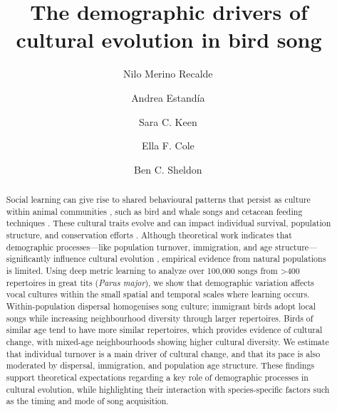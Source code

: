 \documentclass[9pt, onecolumn, twoside, lineno]{gsajnl}
\begin{document}
\title{The demographic drivers of cultural evolution in bird song}
\author[1,$\ast$]{Nilo Merino Recalde\,} 
\author[1]{Andrea Estandía\,}
\author[1,2]{Sara C. Keen\,}
\author[1]{Ella F. Cole\,} 
\author[1]{Ben C. Sheldon\,} 





\begin{abstract}
Social learning can give rise to shared behavioural patterns that persist as culture within animal communities \autocite{viciana2021, whiten2019}, such as bird and whale songs and cetacean feeding techniques \autocite{aplin2019, allen2013, garland2020}. These cultural traits evolve \autocite{potvin2015, williams2021,ju2019,riebel2015} and can impact individual survival, population structure, and conservation efforts \autocite{brakes2019}. Although theoretical work indicates that demographic processes---like population turnover, immigration, and age structure---significantly influence cultural evolution \autocite{deffner2022a, hudson2022, kandler2023}, empirical evidence from natural populations is limited. Using deep metric learning to analyze over 100,000 songs from >400 repertoires in great tits (\textit{Parus major}), we show that demographic variation affects vocal cultures within the small spatial and temporal scales where learning occurs. Within-population dispersal homogenises song culture; immigrant birds adopt local songs while increasing neighbourhood diversity through larger repertoires. Birds of similar age tend to have more similar repertoires, which provides evidence of cultural change, with mixed-age neighbourhoods showing higher cultural diversity. We estimate that individual turnover is a main driver of cultural change, and that its pace is also moderated by dispersal, immigration, and population age structure. These findings support theoretical expectations regarding a key role of demographic processes in cultural evolution, while highlighting their interaction with species-specific factors such as the timing and mode of song acquisition.
\end{abstract}
\end{document}

